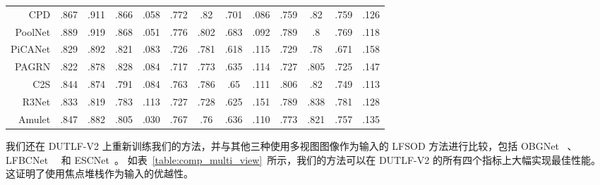 \begin{table}[]
{\begin{tabular}{rcccccccccccc}
			CPD  \cite{wu2019cascaded}
			& .867 & .911 & .866 & .058 
			& .772 & .82  & .701 & .086 
			& .759 & .82  & .759 & .126 \\
			
			PoolNet \cite{liu2019simple}
			& .889 & .919 & .868 & .051 
			& .776 & .802 & .683 & .092 
			& .789 & .8   & .769 & .118 \\
			
			PiCANet \cite{liu2018picanet}
			& .829 & .892 & .821 & .083 
			& .726 & .781 & .618 & .115 
			& .729 & .78  & .671 & .158 \\
			
			PAGRN \cite{wang2018detect}
			& .822 & .878 & .828 & .084 
			& .717 & .773 & .635 & .114 
			& .727 & .805 & .725 & .147 \\
			
			C2S   \cite{li2018contour}
			& .844 & .874 & .791 & .084 
			& .763 & .786 & .65  & .111 
			& .806 & .82  & .749 & .113 \\
			
			R3Net  \cite{deng2018r3net}
			& .833 & .819 & .783 & .113 
			& .727 & .728 & .625 & .151 
			& .789 & .838 & .781 & .128 \\
			
			Amulet \cite{zhang2017amulet}
			& .847 & .882 & .805 & .030 
			& .767 & .76  & .636 & .110  
			& .773 & .821 & .757 & .135 \\
			
			
			\bottomrule %
		\end{tabular}
	}
\end{table}
%
%
%
\par
%
%
%
我们还在 DUTLF-V2 上重新训练我们的方法，并与其他三种使用多视图图像作为输入的 LFSOD 方法进行比较，包括 OBGNet ~\cite{jing2021occlusion}、LFBCNet~\cite{wang2022lfbcnet}~ 和 ESCNet~\cite{zhang2022exploring}。 如表~\ref{table:comp_multi_view}~所示，我们的方法可以在 DUTLF-V2 的所有四个指标上大幅实现最佳性能。 这证明了使用焦点堆栈作为输入的优越性。 
%
%
%
%
